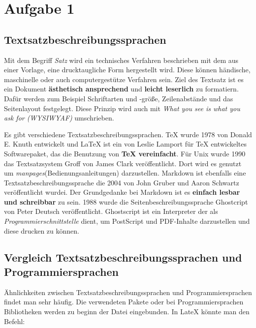 \chapter{Aufgabe 1}
\section{Textsatzbeschreibungssprachen}
Mit dem Begriff \textit{Satz} wird ein technisches Verfahren beschrieben mit dem aus einer Vorlage, eine drucktaugliche Form hergestellt wird.
Diese können händische, maschinelle oder auch computergestütze Verfahren sein.
Ziel des Textsatz ist es ein Dokument \textbf{ästhetisch ansprechend} und \textbf{leicht leserlich} zu formatiern.
Dafür werden zum Beispiel Schriftarten und -größe, Zeilenabstände und das Seitenlayout festgelegt\cite{satzwiki:2023}.
Diese Prinzip wird auch mit \textit{What you see is what you ask for (WYSIWYAF)} umschrieben.\par
Es gibt verschiedene Textsatzbeschreibungssprachen.
TeX wurde 1978 von Donald E. Knuth entwickelt und LaTeX\cite{latex:2023} ist ein von Leslie Lamport für TeX\cite{tex:2023} entwickeltes Softwarepaket, das die Benutzung von \textbf{TeX vereinfacht}.
Für Unix wurde 1990 das Textsatzsystem Groff von James Clark veröffentlicht.
Dort wird es genutzt um \textit{manpages}(Bedienungsanleitungen) darzustellen\cite{groff:2022}.
Markdown ist ebenfalls eine Textsatzbeschreibungssprache die 2004 von John Gruber und Aaron Schwartz veröffentlicht wurdei.
Der Grundgedanke bei Markdown ist es \textbf{einfach lesbar und schreibbar} zu sein\cite{lasar:2013}.
1988 wurde die Seitenbeschreibungssprache Ghostcript von Peter Deutsch veröffentlicht.
Ghostscript ist ein Interpreter der als \textit{Programmierschnittstelle} dient, um PostScript und PDF-Inhalte darzustellen und diese drucken zu können\cite{ghostscript:2022}. 

\section{Vergleich Textsatzbeschreibungssprachen und Programmiersprachen}
Ähnlichkeiten zwischen Textsatzbeschreibungssprachen und Programmiersprachen findet man sehr häufig. 
Die verwendeten Pakete oder bei Programmiersprachen Bibliotheken werden zu beginn der Datei eingebunden.
In LateX könnte man den Befehl:
\begin{lstlisting}
 


\end{lstlisting}

